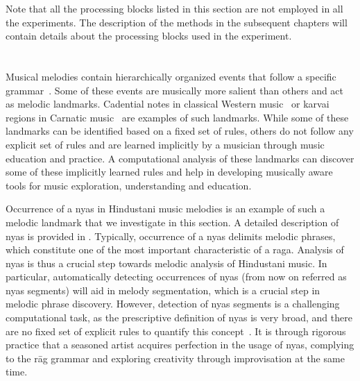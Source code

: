 {Note that all the processing blocks listed in this section are not employed in all the experiments. The description of the methods in the subsequent chapters will contain details about the processing blocks used in the experiment. 

\section{}
\label{sec:pre_processing_nyas_segmentation}

Musical melodies contain hierarchically organized events that follow a specific grammar~\citep{Patel07BOOK}. Some of these events are musically more salient than others and act as melodic landmarks. Cadential notes in classical Western music~\citep{GroveCadence} or \gls{karvai} regions in Carnatic music~\citep{sambamoorthy:1998} are examples of such landmarks. While some of these landmarks can be identified based on a fixed set of rules, others do not follow any explicit set of rules and are learned implicitly by a musician through music education and practice. A computational analysis of these landmarks can discover some of these implicitly learned rules and help in developing musically aware tools for music exploration, understanding and education. 

Occurrence of a \gls{nyas} in Hindustani music melodies is an example of such a melodic landmark that we investigate in this section. A detailed description of \gls{nyas} is provided in . Typically, occurrence of a \gls{nyas} delimits melodic phrases, which constitute one of the most important characteristic of a \gls{raga}. Analysis of \gls{nyas} is thus a crucial step towards melodic analysis of Hindustani music. In particular, automatically detecting occurrences of \gls{nyas} (from now on referred as \gls{nyas} segments) will aid in melody segmentation, which is a crucial step in melodic phrase discovery. However, detection of \gls{nyas} segments is a challenging computational task, as the prescriptive definition of \gls{nyas} is very broad, and there are no fixed set of explicit rules to quantify this concept~\citep[p. 73]{Dey2008}. It is through rigorous practice that a seasoned artist acquires perfection in the usage of \gls{nyas}, complying to the r\={a}g grammar and exploring creativity through improvisation at the same time. 


}
